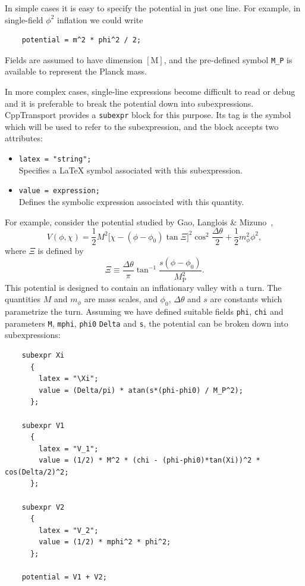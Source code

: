 \documentclass[11pt,a4paper]{article}
\newcommand{\Mp}{M_{\mathrm{P}}}
\newcommand{\packagefont}{\sffamily}
\newcommand{\CppTransport}{{\packagefont CppTransport}}
\newcommand{\block}[1]{\texttt{#1}}
\newcommand{\attribute}[1]{\texttt{#1}}
\newcommand{\descfile}[1]{\texttt{#1}}
\begin{document}
In simple cases it is easy to specify the potential in just one line.
For example, in single-field $\phi^2$ inflation we could write
\begin{verbatim}
    potential = m^2 * phi^2 / 2;
\end{verbatim}
Fields are assumed to have dimension $[\mathrm{M}]$,
and the pre-defined symbol \descfile{M_P} is available to represent
the Planck mass.

In more complex cases, single-line expressions become difficult to read
or debug and it is preferable to break the potential down into subexpressions.
{\CppTransport} provides a \block{subexpr} block for this purpose.
Its tag is the symbol which will be used to refer to the subexpression,
and the block accepts two attributes:
\begin{itemize}
    \item \attribute{latex = "string";} \\
    Specifies a {\LaTeX} symbol associated with this subexpression.
    
    \item \attribute{value = expression;} \\
    Defines the symbolic expression
    associated with this quantity.
\end{itemize}
For example, consider the potential studied
by Gao, Langlois \& Mizuno~\cite{Gao:2012uq},
\begin{equation}
    V(\phi, \chi)
    =
        \frac{1}{2} M^2
        \big[
            \chi - (\phi - \phi_0) \tan \Xi
        \big]^2
        \cos^2 \frac{\Delta\theta}{2}
        +
        \frac{1}{2} m_\phi^2 \phi^2 ,
\end{equation}
where $\Xi$ is defined by
\begin{equation}
    \Xi \equiv \frac{\Delta\theta}{\pi}
    \tan^{-1}
    \frac{s(\phi - \phi_0)}{\Mp^2} .
\end{equation}
This potential is designed to contain an inflationary
valley with a turn.
The quantities $M$ and $m_\phi$ are mass scales, and
$\phi_0$, $\Delta\theta$ and $s$ are
constants which parametrize the turn.
Assuming we have defined
suitable fields \descfile{phi}, \descfile{chi}
and parameters \descfile{M}, \descfile{mphi}, \descfile{phi0}
\descfile{Delta} and \descfile{s},
the potential can be broken down into subexpressions:
\begin{verbatim}
    subexpr Xi
      {
        latex = "\Xi";
        value = (Delta/pi) * atan(s*(phi-phi0) / M_P^2);
      };
    
    subexpr V1
      {
        latex = "V_1";
        value = (1/2) * M^2 * (chi - (phi-phi0)*tan(Xi))^2 * cos(Delta/2)^2;
      };
    
    subexpr V2
      {
        latex = "V_2";
        value = (1/2) * mphi^2 * phi^2;
      };
    
    potential = V1 + V2;
\end{verbatim}
\end{document}
